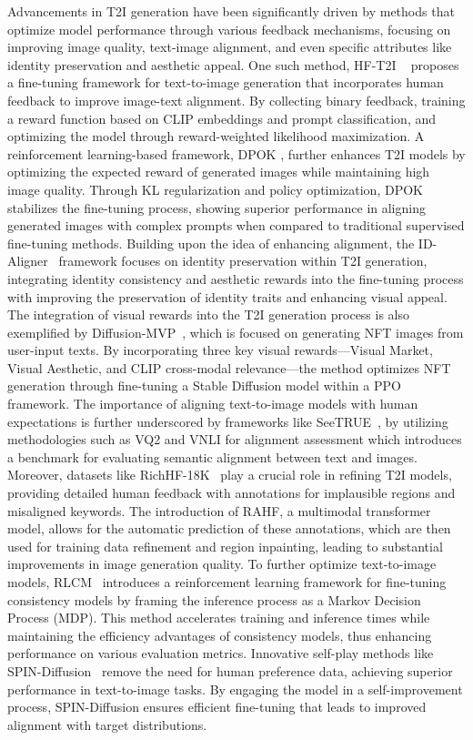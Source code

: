 Advancements in T2I generation have been significantly driven by methods that optimize model performance through various feedback mechanisms, focusing on improving image quality, text-image alignment, and even specific attributes like identity preservation and aesthetic appeal. 
One such method, HF-T2I ~\citep{lee2023aligning} proposes a fine-tuning framework for text-to-image generation that incorporates human feedback to improve image-text alignment. By collecting binary feedback, training a reward function based on CLIP embeddings and prompt classification, and optimizing the model through reward-weighted likelihood maximization.
A reinforcement learning-based framework, DPOK \citep{fan2024reinforcement}, further enhances T2I models by optimizing the expected reward of generated images while maintaining high image quality. Through KL regularization and policy optimization, DPOK stabilizes the fine-tuning process, showing superior performance in aligning generated images with complex prompts when compared to traditional supervised fine-tuning methods. Building upon the idea of enhancing alignment, the ID-Aligner~\citep{chen2024id} framework focuses on identity preservation within T2I generation, integrating identity consistency and aesthetic rewards into the fine-tuning process with improving the preservation of identity traits and enhancing visual appeal. 
The integration of visual rewards into the T2I generation process is also exemplified by Diffusion-MVP~\citep{he2023learning}, which is focused on generating NFT images from user-input texts. By incorporating three key visual rewards—Visual Market, Visual Aesthetic, and CLIP cross-modal relevance—the method optimizes NFT generation through fine-tuning a Stable Diffusion model within a PPO framework. 
The importance of aligning text-to-image models with human expectations is further underscored by frameworks like SeeTRUE~\citep{yarom2024you}, by utilizing methodologies such as VQ2 and VNLI for alignment assessment which introduces a benchmark for evaluating semantic alignment between text and images. Moreover, datasets like RichHF-18K~\citep{liang2024rich} play a crucial role in refining T2I models, providing detailed human feedback with annotations for implausible regions and misaligned keywords. The introduction of RAHF, a multimodal transformer model, allows for the automatic prediction of these annotations, which are then used for training data refinement and region inpainting, leading to substantial improvements in image generation quality.
To further optimize text-to-image models, RLCM~\citep{oertell2024rl} introduces a reinforcement learning framework for fine-tuning consistency models by framing the inference process as a Markov Decision Process (MDP). This method accelerates training and inference times while maintaining the efficiency advantages of consistency models, thus enhancing performance on various evaluation metrics. Innovative self-play methods like SPIN-Diffusion~\citep{yuan2024self} remove the need for human preference data, achieving superior performance in text-to-image tasks. By engaging the model in a self-improvement process, SPIN-Diffusion ensures efficient fine-tuning that leads to improved alignment with target distributions.
